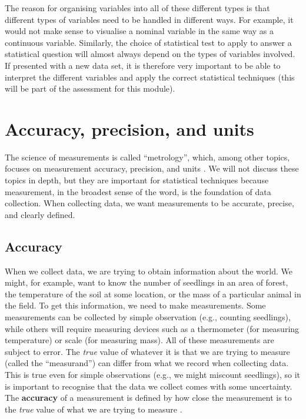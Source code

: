 \documentclass[
]{scrbook}
\begin{document}
The reason for organising variables into all of these different types is that different types of variables need to be handled in different ways.
For example, it would not make sense to visualise a nominal variable in the same way as a continuous variable.
Similarly, the choice of statistical test to apply to answer a statistical question will almost always depend on the types of variables involved.
If presented with a new data set, it is therefore very important to be able to interpret the different variables and apply the correct statistical techniques (this will be part of the assessment for this module).

\hypertarget{Chapter_6}{%
\chapter{Accuracy, precision, and units}\label{Chapter_6}}

The science of measurements is called ``metrology'', which, among other topics, focuses on measurement accuracy, precision, and units \citep{Rabinovich2013}.
We will not discuss these topics in depth, but they are important for statistical techniques because measurement, in the broadest sense of the word, is the foundation of data collection.
When collecting data, we want measurements to be accurate, precise, and clearly defined.

\hypertarget{accuracy}{%
\section{Accuracy}\label{accuracy}}

When we collect data, we are trying to obtain information about the world.
We might, for example, want to know the number of seedlings in an area of forest, the temperature of the soil at some location, or the mass of a particular animal in the field.
To get this information, we need to make measurements.
Some measurements can be collected by simple observation (e.g., counting seedlings), while others will require measuring devices such as a thermometer (for measuring temperature) or scale (for measuring mass).
All of these measurements are subject to error.
The \emph{true} value of whatever it is that we are trying to measure (called the ``measurand'') can differ from what we record when collecting data.
This is true even for simple observations (e.g., we might miscount seedlings), so it is important to recognise that the data we collect comes with some uncertainty.
The \textbf{accuracy} of a measurement is defined by how close the measurement is to the \emph{true} value of what we are trying to measure \citep{Rabinovich2013}.
\end{document}
